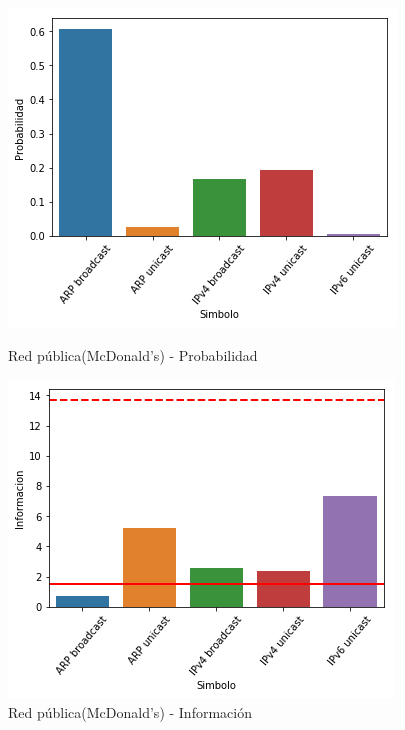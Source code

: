 \begin{figure}[H]
	\begin{minipage}{0.49\textwidth}
		\centering
		\includegraphics[width=\linewidth]{imagenes/mac_barras_prob}
		\caption{Red pública(McDonald's) - Probabilidad}
		\label{mac_barras_prob}		
	\end{minipage}
	\begin{minipage}{0.49\textwidth}
		\centering
		\includegraphics[width=\linewidth]{imagenes/mac_barras_info}
		\caption{Red pública(McDonald's) - Información}
		\label{mac_barras_info}		
	\end{minipage}
\end{figure}

